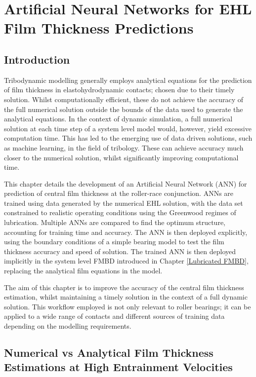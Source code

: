 \chapter{Artificial Neural Networks for EHL Film Thickness Predictions}
\label{ANN Lubricated Bearing FMBD}

\section{Introduction}

Tribodynamic modelling generally employs analytical equations for the prediction of film thickness in elastohydrodynamic contacts; chosen due to their timely solution. Whilst computationally efficient, these do not achieve the accuracy of the full numerical solution outside the bounds of the data used to generate the analytical equations. In the context of dynamic simulation, a full numerical solution at each time step of a system level model would, however, yield excessive computation time. This has led to the emerging use of data driven solutions, such as machine learning, in the field of tribology. These can achieve accuracy much closer to the numerical solution, whilst significantly improving computational time.

This chapter details the development of an Artificial Neural Network (ANN) for prediction of central film thickness at the roller-race conjunction. ANNs are trained using data generated by the numerical EHL solution, with the data set constrained to realistic operating conditions using the Greenwood regimes of lubrication. Multiple ANNs are compared to find the optimum structure, accounting for training time and accuracy. The ANN is then deployed explicitly, using the boundary conditions of a simple bearing model to test the film thickness accuracy and speed of solution. The trained ANN is then deployed implicitly in the system level FMBD introduced in Chapter \ref{Lubricated FMBD}, replacing the analytical film equations in the model.

The aim of this chapter is to improve the accuracy of the central film thickness estimation, whilst maintaining a timely solution in the context of a full dynamic solution. This workflow employed is not only relevant to roller bearings; it can be applied to a wide range of contacts and different sources of training data depending on the modelling requirements.

\section{Numerical vs Analytical Film Thickness Estimations at High Entrainment Velocities}

